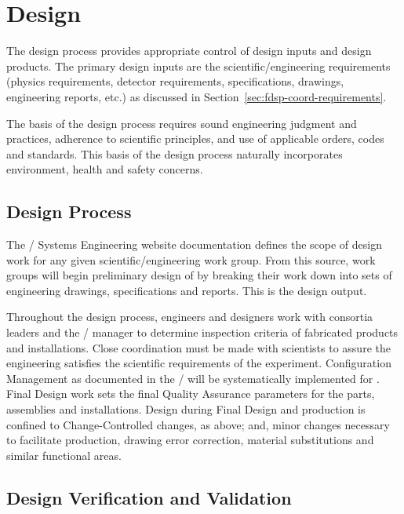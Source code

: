 \section{Design}

The  design process provides appropriate control of design
inputs and design products. The primary design inputs are the
 scientific/engineering requirements (physics
requirements, detector requirements, specifications, drawings,
engineering reports, etc.) as discussed in
Section~\ref{sec:fdsp-coord-requirements}.

The basis of the design process requires sound engineering judgment
and practices, adherence to scientific principles, and use of
applicable orders, codes and standards. This basis of the design
process naturally incorporates environment, health and safety
concerns.

\subsection{Design Process}

The / Systems Engineering website
documentation defines the scope of design work for any given
scientific/engineering work group. From this source, work groups
will begin preliminary design of  by breaking their work
down into sets of engineering drawings, specifications and
reports. This is the design output.

Throughout the design process, engineers and designers work with
consortia leaders and the /  manager to
determine  inspection criteria of fabricated products and
installations. Close coordination must be made with 
scientists to assure the engineering satisfies the scientific
requirements of the experiment. Configuration Management as documented
in the /  will be
systematically implemented for . Final Design work sets
the final Quality Assurance parameters for the parts, assemblies and
installations. Design during Final Design and production is confined
to Change-Controlled changes, as above; and, minor changes necessary
to facilitate production, drawing error correction, material
substitutions and similar functional areas.

\subsection{Design Verification and Validation}
\label{sec:verification}

